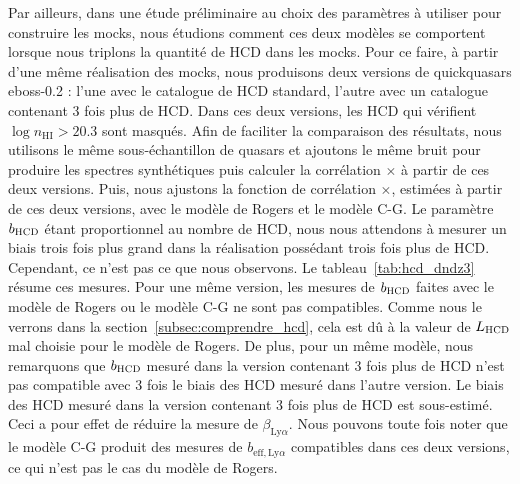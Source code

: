Par ailleurs, dans une étude préliminaire au choix des paramètres \lya{} à utiliser pour construire les mocks, nous étudions comment ces deux modèles se comportent lorsque nous triplons la quantité de HCD dans les mocks.
Pour ce faire, à partir d'une même réalisation des mocks, nous produisons deux versions de quickquasars eboss-0.2 : l'une avec le catalogue de HCD standard, l'autre avec un catalogue contenant 3 fois plus de HCD. Dans ces deux versions, les HCD qui vérifient $\log n_{\mathrm{HI}} > \num{20.3}$ sont masqués. Afin de faciliter la comparaison des résultats, nous utilisons le même sous-échantillon de quasars et ajoutons le même bruit pour produire les spectres synthétiques puis calculer la corrélation \lya{}$\times$\lya{} à partir de ces deux versions.
Puis, nous ajustons la fonction de corrélation \lya{}$\times$\lya{}, estimées à partir de ces deux versions, avec le modèle de Rogers et le modèle C-G. Le paramètre $b_{\textsc{HCD}} $ étant proportionnel au nombre de HCD, nous nous attendons à mesurer un biais trois fois plus grand dans la réalisation possédant trois fois plus de HCD.
Cependant, ce n'est pas ce que nous observons. Le tableau~\ref{tab:hcd_dndz3} résume ces mesures.
Pour une même version, les mesures de $b_{\textsc{HCD}}$ faites avec le modèle de Rogers ou le modèle C-G ne sont pas compatibles.
Comme nous le verrons dans la section~\ref{subsec:comprendre_hcd}, cela est dû à la valeur de $L_{\textsc{HCD}}$ mal choisie pour le modèle de Rogers.
De plus, pour un même modèle, nous remarquons que $b_{\textsc{HCD}}$  mesuré dans la version contenant 3 fois plus de HCD n'est pas compatible avec 3 fois le biais des HCD mesuré dans l'autre version. Le biais des HCD mesuré dans la version contenant 3 fois plus de HCD est sous-estimé.
Ceci a pour effet de réduire la mesure de $\beta_{\mathrm{Ly}\alpha}$.
Nous pouvons toute fois noter que le modèle C-G produit des mesures de $b_{\mathrm{eff},\mathrm{Ly}\alpha}$ compatibles dans ces deux versions, ce qui n'est pas le cas du modèle de Rogers.


